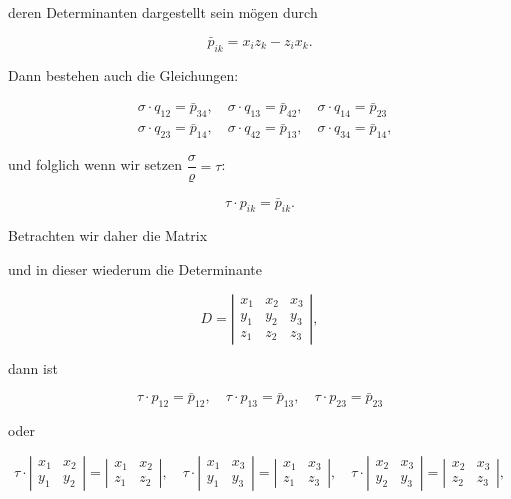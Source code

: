 
deren Determinanten dargestellt sein mögen durch

\[ \bar p_{ik} = x_iz_k - z_ix_k. \]

Dann bestehen auch die Gleichungen:

\[ \begin{aligned}
&\sigma\cdot q_{12}=\bar p_{34},\quad \sigma\cdot q_{13}=\bar p_{42},\quad \sigma\cdot q_{14}=\bar p_{23}\\
&\sigma\cdot q_{23}=\bar p_{14},\quad \sigma\cdot q_{42}=\bar p_{13},\quad \sigma\cdot q_{34}=\bar p_{14},
\end{aligned} \]

und folglich wenn wir setzen $\dfrac{\sigma}{\varrho}=\tau$:

\[ \tau\cdot p_{ik} = \bar p_{ik}. \]

Betrachten wir daher die Matrix


und in dieser wiederum die Determinante

\[ D = \left| \begin{array}{ccc} x_1 & x_2 & x_3 \\ y_1 & y_2 & y_3 \\ z_1 & z_2 & z_3 \end{array} \right|, \]

dann ist

\[ \tau\cdot p_{12}=\bar p_{12},\quad \tau\cdot p_{13}=\bar p_{13},\quad \tau\cdot p_{23}=\bar p_{23} \]

oder

\[ \tau\cdot \left|\begin{array}{cc} x_1&x_2\\ y_1&y_2\end{array}\right| = \left|\begin{array}{cc} x_1&x_2\\ z_1&z_2\end{array}\right|,\quad
\tau\cdot \left|\begin{array}{cc} x_1&x_3\\ y_1&y_3\end{array}\right| = \left|\begin{array}{cc} x_1&x_3\\ z_1&z_3\end{array}\right|,\quad
\tau\cdot \left|\begin{array}{cc} x_2&x_3\\ y_2&y_3\end{array}\right| = \left|\begin{array}{cc} x_2&x_3\\ z_2&z_3\end{array}\right|, \]

